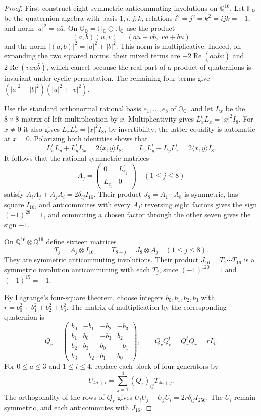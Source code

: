 \documentclass[11pt]{article}
\numberwithin{equation}{section}
\theoremstyle{definition}
\theoremstyle{remark}
\newcommand{\Q}{\mathbb Q}
\begin{document}
\begin{proof}
First construct eight symmetric anticommuting involutions on $\Q^{16}$.
Let $\mathbb H_{\Q}$ be the quaternion algebra with basis $1,i,j,k$,
relations $i^2=j^2=k^2=ijk=-1$, and norm
$|a|^2=a\bar a$.  On
$\mathbb O_{\Q}=\mathbb H_{\Q}\oplus\mathbb H_{\Q}$ use the product
\[
 (a,b)(u,v)=(au-\bar v b,\;va+b\bar u)
\]
and the norm $|(a,b)|^2=|a|^2+|b|^2$.
This norm is multiplicative.  Indeed, on expanding the two squared
norms, their mixed terms are
$-2\operatorname{Re}(au\bar b v)$ and
$2\operatorname{Re}(vau\bar b)$, which cancel because the real part of
a product of quaternions is invariant under cyclic permutation.
The remaining four terms give
$(|a|^2+|b|^2)(|u|^2+|v|^2)$.

Use the standard orthonormal rational basis $e_1,\ldots,e_8$ of
$\mathbb O_{\Q}$, and let $L_x$ be the $8\times8$ matrix of left
multiplication by $x$.  Multiplicativity gives
$L_x^tL_x=|x|^2I_8$.  For $x\ne0$ it also gives
$L_xL_x^t=|x|^2I_8$, by invertibility; the latter equality is automatic
at $x=0$.  Polarizing both identities shows that
\[
 L_x^tL_y+L_y^tL_x=2\langle x,y\rangle I_8,
 \qquad
 L_xL_y^t+L_yL_x^t=2\langle x,y\rangle I_8.
\]
It follows that the rational symmetric matrices
\[
 A_j=\begin{pmatrix}0&L_{e_j}^t\\L_{e_j}&0\end{pmatrix}
 \quad(1\le j\le8)
\]
satisfy $A_iA_j+A_jA_i=2\delta_{ij}I_{16}$.
Their product $J_8=A_1\cdots A_8$ is symmetric, has square $I_{16}$,
and anticommutes with every $A_j$: reversing eight factors gives the
sign $(-1)^{28}=1$, and commuting a chosen factor through the other
seven gives the sign $-1$.

On $\Q^{16}\otimes\Q^{16}$ define sixteen matrices
\[
 T_j=A_j\otimes I_{16},\qquad
 T_{8+j}=J_8\otimes A_j\quad(1\le j\le8).
\]
They are symmetric anticommuting involutions.  Their product
$J_{16}=T_1\cdots T_{16}$ is a symmetric involution anticommuting with
each $T_j$, since $(-1)^{120}=1$ and $(-1)^{15}=-1$.

By Lagrange's four-square theorem, choose integers
$b_0,b_1,b_2,b_3$ with $r=b_0^2+b_1^2+b_2^2+b_3^2$.
The matrix of multiplication by the corresponding quaternion is
\[
 Q_r=\begin{pmatrix}
 b_0&-b_1&-b_2&-b_3\\
 b_1&b_0&-b_3&b_2\\
 b_2&b_3&b_0&-b_1\\
 b_3&-b_2&b_1&b_0
 \end{pmatrix},\qquad
 Q_rQ_r^t=Q_r^tQ_r=rI_4.
\]
For $0\le a\le3$ and $1\le i\le4$, replace each block of four
generators by
\[
 U_{4a+i}=\sum_{j=1}^4(Q_r)_{ij}T_{4a+j}.
\]
The orthogonality of the rows of $Q_r$ gives
$U_iU_j+U_jU_i=2r\delta_{ij}I_{256}$.  The $U_i$ remain symmetric,
and each anticommutes with $J_{16}$.


\end{proof}
\end{document}
